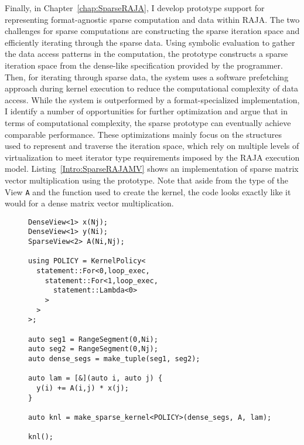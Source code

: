 Finally, in Chapter~\ref{chap:SparseRAJA}, I develop prototype support for representing format-agnostic sparse computation and data within RAJA\@.
The two challenges for sparse computations are constructing the sparse iteration space and efficiently iterating through the sparse data.
Using symbolic evaluation to gather the data access patterns in the computation, the prototype constructs a sparse iteration space from the dense-like specification provided by the programmer.
Then, for iterating through sparse data, the system uses a software prefetching approach during kernel execution to reduce the computational complexity of data access.
While the system is outperformed by a format-specialized implementation, I identify a number of opportunities for further optimization and argue that in terms of computational complexity, the sparse prototype can eventually achieve comparable performance.
These optimizations mainly focus on the structures used to represent and traverse the iteration space, which rely on multiple levels of virtualization to meet iterator type requirements imposed by the RAJA execution model.
Listing~\ref{Intro:SparseRAJAMV} shows an implementation of sparse matrix vector multiplication using the prototype.
Note that aside from the type of the View \verb.A. and the function used to create the kernel, the code looks exactly like it would for a dense matrix vector multiplication.
\begin{figure}
\begin{lstlisting}[caption={Implementation of SpMV using the SparseRAJA prototype},label=Intro:SparseRAJAMV]
DenseView<1> x(Nj);
DenseView<1> y(Ni);
SparseView<2> A(Ni,Nj);

using POLICY = KernelPolicy<
  statement::For<0,loop_exec,
    statement::For<1,loop_exec,
      statement::Lambda<0>
    >
  >
>;

auto seg1 = RangeSegment(0,Ni);
auto seg2 = RangeSegment(0,Nj);
auto dense_segs = make_tuple(seg1, seg2);

auto lam = [&](auto i, auto j) {
  y(i) += A(i,j) * x(j);
}

auto knl = make_sparse_kernel<POLICY>(dense_segs, A, lam);
  
knl();
\end{lstlisting}
\end{figure}